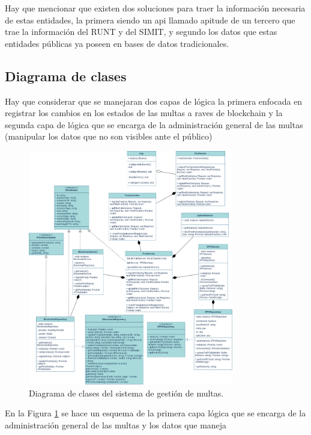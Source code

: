 \documentclass[
    letterpaper, 
    man,   
    spanish,
    12pt,
    donotrepeattitle,
    floatsintext,
    hidelinks %
]{apa7}
\begin{document}
Hay que mencionar que existen dos soluciones para traer la información necesaria de estas entidades, la primera siendo un api llamado apitude de un tercero que trae la información del RUNT y del SIMIT, y segundo los datos que estas entidades públicas ya poseen en bases de datos tradicionales. 
 \subsection{ Diagrama de clases }
Hay que considerar que se manejaran dos capas de lógica la primera enfocada en registrar los cambios en los estados de las multas a raves de blockchain y la segunda capa de lógica que se encarga de la administración general de las multas (manipular los datos que no son visibles ante el público) 
 \begin{figure}[htbp]
    \centering
    \includegraphics[width=0.8\textwidth]{Images/uml.png}
    \caption{Diagrama de clases del sistema de gestión de multas.}
    \label{fig:diagrama_clases}
\end{figure}
En la Figura \ref{fig:diagrama_clases} se hace un esquema de la primera capa lógica que se encarga de la administración general de las multas y los datos que maneja
\end{document}
